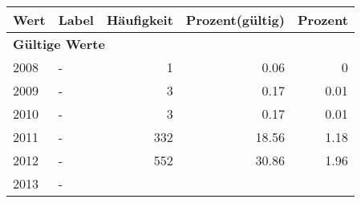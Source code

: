      \begin{longtable}{lXrrr}
     \toprule
     \textbf{Wert} & \textbf{Label} & \textbf{Häufigkeit} & \textbf{Prozent(gültig)} & \textbf{Prozent} \\
     \endhead
     \midrule
     \multicolumn{5}{l}{\textbf{Gültige Werte}}\\

     2008 &
     \multicolumn{1}{X}{ -  } &


       \num{1} &
       \num[round-mode=places,round-precision=2]{0,06} &
         \num[round-mode=places,round-precision=2]{0} \\

     2009 &
     \multicolumn{1}{X}{ -  } &


       \num{3} &
       \num[round-mode=places,round-precision=2]{0,17} &
         \num[round-mode=places,round-precision=2]{0,01} \\

     2010 &
     \multicolumn{1}{X}{ -  } &


       \num{3} &
       \num[round-mode=places,round-precision=2]{0,17} &
         \num[round-mode=places,round-precision=2]{0,01} \\

     2011 &
     \multicolumn{1}{X}{ -  } &


       \num{332} &
       \num[round-mode=places,round-precision=2]{18,56} &
         \num[round-mode=places,round-precision=2]{1,18} \\

     2012 &
     \multicolumn{1}{X}{ -  } &


       \num{552} &
       \num[round-mode=places,round-precision=2]{30,86} &
         \num[round-mode=places,round-precision=2]{1,96} \\

     2013 &
     \multicolumn{1}{X}{ -  } &



\end{longtable}

